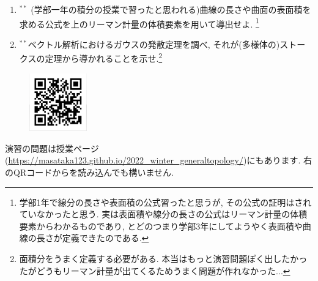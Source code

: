 \documentclass[dvipdfmx,a4paper,11pt]{article}
\newcommand{\R}{\mathbb{R}}
\theoremstyle{definition}
\begin{document}
\begin{enumerate}[label=\textbf{問}3.\arabic*]
\begin{enumerate}
\end{enumerate}

\item $^{**}$ (学部一年の積分の授業で習ったと思われる)曲線の長さや曲面の表面積を求める公式を上のリーマン計量の体積要素を用いて導出せよ. \footnote{学部1年で線分の長さや表面積の公式習ったと思うが, その公式の証明はされていなかったと思う. 実は表面積や線分の長さの公式はリーマン計量の体積要素からわかるものであり, とどのつまり学部3年にしてようやく表面積や曲線の長さが定義できたのである. }

\item $^{**}$ベクトル解析におけるガウスの発散定理を調べ, それが(多様体の)ストークスの定理から導かれることを示せ.\footnote{面積分をうまく定義する必要がある. 本当はもっと演習問題ぽく出したかったがどうもリーマン計量が出てくるためうまく問題が作れなかった...} 

\end{enumerate}

\vspace{11pt}
\begin{figure}
  \centering
 \includegraphics[height=25mm, width=25mm]{stokes.png}
\end{figure}

演習の問題は授業ページ(\url{https://masataka123.github.io/2022_winter_generaltopology/})にもあります. 
右のQRコードからを読み込んでも構いません.
\end{document}
